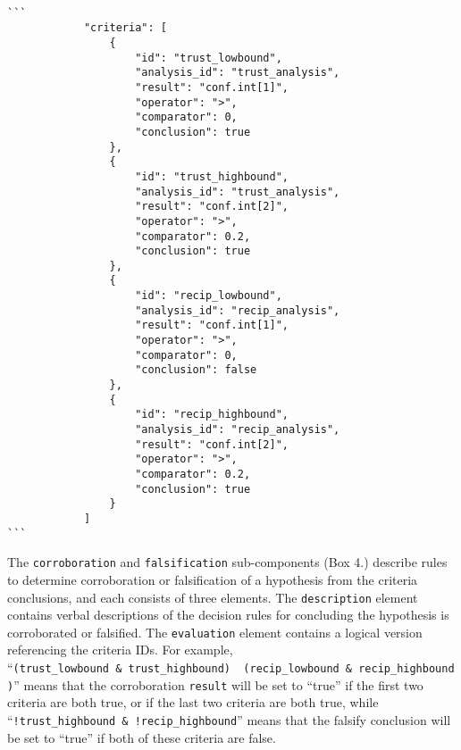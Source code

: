\documentclass[english,doc,floatsintext]{apa6}
\begin{document}
\begin{tcolorbox}[colback=black!5!white,colframe=white!5!black,title=Box 3. Criteria for evaluation.]
\begin{verbatim}

```
            "criteria": [
                {
                    "id": "trust_lowbound",
                    "analysis_id": "trust_analysis",
                    "result": "conf.int[1]",
                    "operator": ">",
                    "comparator": 0,
                    "conclusion": true
                },
                {
                    "id": "trust_highbound",
                    "analysis_id": "trust_analysis",
                    "result": "conf.int[2]",
                    "operator": ">",
                    "comparator": 0.2,
                    "conclusion": true
                },
                {
                    "id": "recip_lowbound",
                    "analysis_id": "recip_analysis",
                    "result": "conf.int[1]",
                    "operator": ">",
                    "comparator": 0,
                    "conclusion": false
                },
                {
                    "id": "recip_highbound",
                    "analysis_id": "recip_analysis",
                    "result": "conf.int[2]",
                    "operator": ">",
                    "comparator": 0.2,
                    "conclusion": true
                }
            ]
```

\end{verbatim}
\end{tcolorbox}

The \texttt{corroboration} and \texttt{falsification} sub-components (Box 4.) describe rules to determine corroboration or falsification of a hypothesis from the criteria conclusions, and each consists of three elements. The \texttt{description} element contains verbal descriptions of the decision rules for concluding the hypothesis is corroborated or falsified. The \texttt{evaluation} element contains a logical version referencing the criteria IDs. For example, \enquote{\texttt{(trust\_lowbound\ \&\ trust\_highbound)\ \textbar{}\ (recip\_lowbound\ \&\ recip\_highbound)}} means that the corroboration \texttt{result} will be set to \enquote{true} if the first two criteria are both true, or if the last two criteria are both true, while \enquote{\texttt{!trust\_highbound\ \&\ !recip\_highbound}} means that the falsify conclusion will be set to \enquote{true} if both of these criteria are false.
\end{document}

